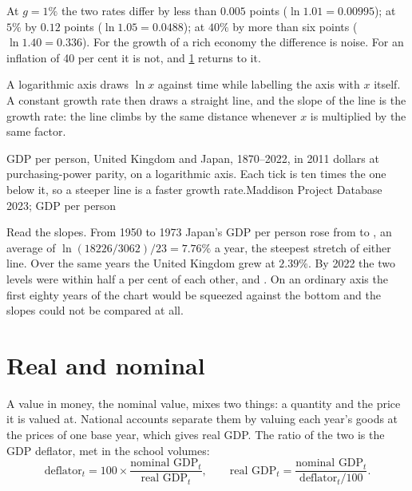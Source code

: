 At $g = 1\%$ the two rates differ by less than $0.005$ points
($\ln 1.01 = 0.00995$); at $5\%$ by $0.12$ points ($\ln 1.05 = 0.0488$); at
$40\%$ by more than six points ($\ln 1.40 = 0.336$). For the growth of a
rich economy the difference is noise. For an inflation of 40 per cent it is
not, and \cref{sec:b1:models-and-data:real} returns to it.

A logarithmic axis draws $\ln x$ against time while labelling the axis
with $x$ itself. A constant growth rate then draws a straight line, and the
slope of the line is the growth rate: the line climbs by the same distance
whenever $x$ is multiplied by the same factor.

\begin{omchart}{GDP per person, United Kingdom and Japan, 1870--2022, in 2011
dollars at purchasing-power parity, on a logarithmic axis. Each tick is ten
times the one below it, so a steeper line is a faster growth rate.}{Maddison
Project Database 2023; GDP per person}
\end{omchart}

Read the slopes. From 1950 to 1973 Japan's GDP per person rose from
 to , an average  of
$\ln(18226/3062)/23 = 7.76\%$ a year, %
the steepest stretch of either line. Over the same years the United
Kingdom grew at $2.39\%$. %
By 2022 the two levels were within half a per cent of each other, 
and . %
On an ordinary axis the first eighty years of the chart would be squeezed
against the bottom and the slopes could not be compared at all.

\section{Real and nominal}\label{sec:b1:models-and-data:real}

A value in money, the nominal value, mixes two things: a quantity and the
price it is valued at. National accounts separate them by valuing each
year's goods at the prices of one base year, which gives real GDP. The
ratio of the two is the GDP deflator, met in the school volumes:
\[
\text{deflator}_t = 100 \times \frac{\text{nominal GDP}_t}{\text{real GDP}_t},
\qquad
\text{real GDP}_t = \frac{\text{nominal GDP}_t}{\text{deflator}_t/100}.
\]


